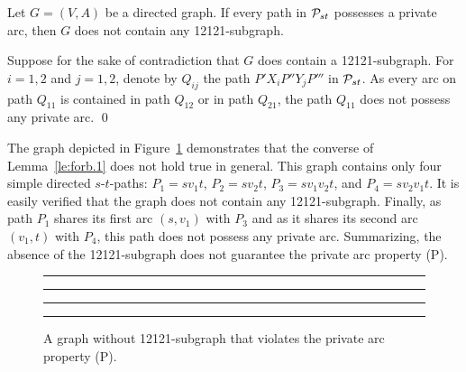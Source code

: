 \documentclass[11pt,fleqn]{article}
\begin{document}
\begin{lemma}
\label{le:forb.1}
Let $G=(V,A)$ be a directed graph. 
If every path in ${\cal P}_{st}$ possesses a private arc,
then $G$ does not contain any 12121-subgraph.
\end{lemma}
\proof
Suppose for the sake of contradiction that $G$ does contain a 12121-subgraph.
For $i=1,2$ and $j=1,2$, denote by $Q_{ij}$ the path $P'X_iP''Y_jP'''$ in ${\cal P}_{st}$.
As every arc on path $Q_{11}$ is contained in path $Q_{12}$ or in path $Q_{21}$, the path $Q_{11}$
does not possess any private arc.
\qed

\bigskip
The graph depicted in Figure~\ref{fig:bad-example} demonstrates that the 
converse of Lemma~\ref{le:forb.1} does not hold true in general.
This graph contains only four simple directed $s$-$t$-paths: 
$P_1=sv_1t$,
$P_2=sv_2t$,
$P_3=sv_1v_2t$, and
$P_4=sv_2v_1t$.
It is easily verified that the graph does not contain any 12121-subgraph.
Finally, as path $P_1$ shares its first arc $(s,v_1)$ with $P_3$ and as it shares
its second arc $(v_1,t)$ with $P_4$, this path does not possess any private arc.
Summarizing, the absence of the 12121-subgraph does not guarantee the private arc property (P).

\begin{figure}[bth]
\hrule\hrule
\bigskip
\begin{center}
\end{center}
\vspace{-4ex}
\caption{A graph without 12121-subgraph that violates the private arc property (P).}
\label{fig:bad-example}
\bigskip
\hrule\hrule
\end{figure}
\end{document}
